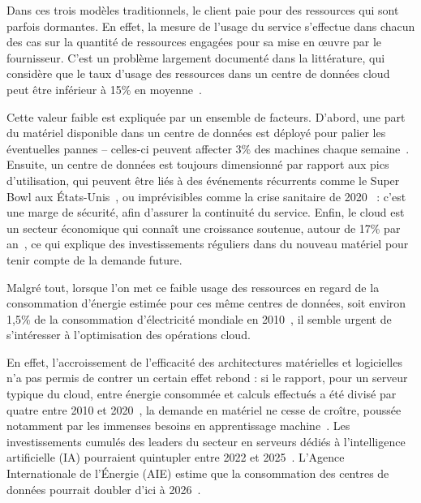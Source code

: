 Dans ces trois modèles traditionnels, le client paie pour des ressources qui sont parfois dormantes. En effet, la mesure de l'usage du service s'effectue dans chacun des cas sur la quantité de ressources engagées pour sa mise en œuvre par le fournisseur. C'est un problème largement documenté dans la littérature, qui considère que le taux d'usage des ressources dans un centre de données cloud peut être inférieur à 15\% en moyenne~\cite{vasanWorthTheirWatts2010, vermaLargescaleClusterManagement2015a}.

Cette valeur faible est expliquée par un ensemble de facteurs. D'abord, une part du matériel disponible dans un centre de données est déployé pour palier les éventuelles pannes -- celles-ci peuvent affecter 3\% des machines chaque semaine~\cite{BareMetal70B}. Ensuite, un centre de données est toujours dimensionné par rapport aux pics d'utilisation, qui peuvent être liés à des événements récurrents comme le Super Bowl aux États-Unis~\cite{wangTouchdownCloudImpact2019}, ou imprévisibles comme la crise sanitaire de 2020~\cite{} : c'est une marge de sécurité, afin d'assurer la continuité du service. Enfin, le cloud est un secteur économique qui connaît une croissance soutenue, autour de 17\% par an~\cite{}, ce qui explique des investissements réguliers dans du nouveau matériel pour tenir compte de la demande future.

Malgré tout, lorsque l'on met ce faible usage des ressources en regard de la consommation d'énergie estimée pour ces même centres de données, soit environ 1,5\% de la consommation d'électricité mondiale en 2010~\cite{masanetRecalibratingGlobalData2020}, il semble urgent de s'intéresser à l'optimisation des opérations cloud.

En effet, l'accroissement de l'efficacité des architectures matérielles et logicielles n'a pas permis de contrer un certain effet rebond : si le rapport, pour un serveur typique du cloud, entre énergie consommée et calculs effectués a été divisé par quatre entre 2010 et 2020~\cite{masanetRecalibratingGlobalData2020}, la demande en matériel ne cesse de croître, poussée notamment par les immenses besoins en apprentissage machine~\cite{commentMetaOperate6002024}. Les investissements cumulés des leaders du secteur en serveurs dédiés à l'intelligence artificielle (IA) pourraient quintupler entre 2022 et 2025~\cite{DerriereIADeferlante2024, elderNextWaveAI2024}. L'Agence Internationale de l'Énergie (AIE) estime que la consommation des centres de données pourrait doubler d'ici à 2026~\cite{Electricity2024Analysis2024}.

